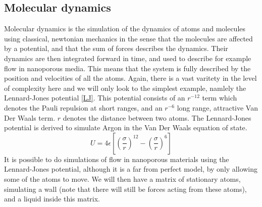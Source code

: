 \documentclass[a4paper,english, 12pt, twoside]{article}
\begin{document}
\subsection{Molecular dynamics}\label{MD}
Molecular dynamics is the simulation of the dynamics of atoms and molecules using classical, newtonian mechanics in the sense that the molecules are affected by a potential, and that the sum of forces describes the dynamics. 
Their dynamics are then integrated forward in time, and used to describe for example flow in nanoporous media. This means that the system is fully described by the position and velocities of all the atoms. 
Again, there is a vast varitety in the level of complexity here and we will only look to the simplest example, namlely the Lennard-Jones potential \ref{LJ}. 
This potential consists of an $r^{-12}$ term which denotes the Pauli repulsion at short ranges, and an $r^{-6}$ long range, attractive Van Der Waals term. $r$ denotes the distance between two atoms. 
The Lennard-Jones potential is derived to simulate Argon in the Van Der Waals equation of state.
\begin{equation}\label{LJ}
 U = 4\epsilon\left[\left(\frac{\sigma}{r}\right)^{12}-\left(\frac{\sigma}{r}\right)^{6}\right]
\end{equation}
It is possible to do simulations of flow in nanoporous materials using the Lennard-Jones potential, although it is a far from perfect model, by only allowing some of the atoms to move. 
We will then have a matrix of stationary atoms, simulating a wall (note that there will still be forces acting from these atoms), and a liquid inside this matrix.
\end{document}
